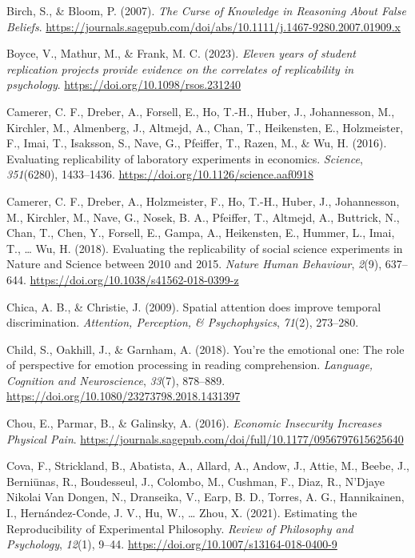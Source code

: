 \documentclass[
  english,
  a4paper,
]{article}
\newlength{\cslhangindent}
\newenvironment{CSLReferences}[2] %
{\begin{list}{}{%
			\setlength{\itemindent}{0pt}
			\setlength{\leftmargin}{0pt}
			\setlength{\parsep}{0pt}
			\ifodd #1
			\setlength{\leftmargin}{\cslhangindent}
			\setlength{\itemindent}{-1\cslhangindent}
			\fi
			\setlength{\itemsep}{#2\baselineskip}}}
	{\end{list}}
\begin{document}
\protect{}\label{refs}
\begin{CSLReferences}{1}{0}
Birch, S., \& Bloom, P. (2007). \emph{The {Curse} of {Knowledge} in {Reasoning About False Beliefs}}. \url{https://journals.sagepub.com/doi/abs/10.1111/j.1467-9280.2007.01909.x}

Boyce, V., Mathur, M., \& Frank, M. C. (2023). \emph{Eleven years of student replication projects provide evidence on the correlates of replicability in psychology}. \url{https://doi.org/10.1098/rsos.231240}

Camerer, C. F., Dreber, A., Forsell, E., Ho, T.-H., Huber, J., Johannesson, M., Kirchler, M., Almenberg, J., Altmejd, A., Chan, T., Heikensten, E., Holzmeister, F., Imai, T., Isaksson, S., Nave, G., Pfeiffer, T., Razen, M., \& Wu, H. (2016). Evaluating replicability of laboratory experiments in economics. \emph{Science}, \emph{351}(6280), 1433--1436. \url{https://doi.org/10.1126/science.aaf0918}

Camerer, C. F., Dreber, A., Holzmeister, F., Ho, T.-H., Huber, J., Johannesson, M., Kirchler, M., Nave, G., Nosek, B. A., Pfeiffer, T., Altmejd, A., Buttrick, N., Chan, T., Chen, Y., Forsell, E., Gampa, A., Heikensten, E., Hummer, L., Imai, T., \ldots{} Wu, H. (2018). Evaluating the replicability of social science experiments in {Nature} and {Science} between 2010 and 2015. \emph{Nature Human Behaviour}, \emph{2}(9), 637--644. \url{https://doi.org/10.1038/s41562-018-0399-z}

Chica, A. B., \& Christie, J. (2009). Spatial attention does improve temporal discrimination. \emph{Attention, Perception, \& Psychophysics}, \emph{71}(2), 273--280.

Child, S., Oakhill, J., \& Garnham, A. (2018). You're the emotional one: The role of perspective for emotion processing in reading comprehension. \emph{Language, Cognition and Neuroscience}, \emph{33}(7), 878--889. \url{https://doi.org/10.1080/23273798.2018.1431397}

Chou, E., Parmar, B., \& Galinsky, A. (2016). \emph{Economic {Insecurity Increases Physical Pain}}. \url{https://journals.sagepub.com/doi/full/10.1177/0956797615625640}

Cova, F., Strickland, B., Abatista, A., Allard, A., Andow, J., Attie, M., Beebe, J., Berniūnas, R., Boudesseul, J., Colombo, M., Cushman, F., Diaz, R., N'Djaye Nikolai Van Dongen, N., Dranseika, V., Earp, B. D., Torres, A. G., Hannikainen, I., Hernández-Conde, J. V., Hu, W., \ldots{} Zhou, X. (2021). Estimating the {Reproducibility} of {Experimental Philosophy}. \emph{Review of Philosophy and Psychology}, \emph{12}(1), 9--44. \url{https://doi.org/10.1007/s13164-018-0400-9}


\end{CSLReferences}
\end{document}
